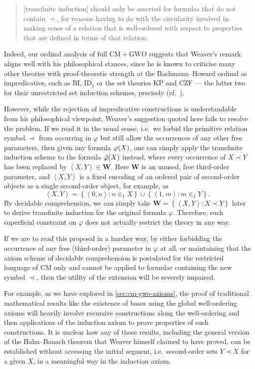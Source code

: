 \documentclass[12pt,openany]{book}
\theoremstyle{plain}
\theoremstyle{definition}
\newcommand\tuple[1]{\left\langle #1 \right\rangle}
\newcommand\BI{\mathrm{BI}}
\newcommand\ID{\mathrm{ID}}
\newcommand\KP{\mathrm{KP}}
\newcommand\CZF{\mathrm{CZF}}
\newcommand\CM{\mathrm{CM}}
\newcommand\GWO{\mathrm{GWO}}
\begin{document}
\begin{quote}
  [transfinite induction] should only be asserted for formulas that do not contain $\prec$, for reasons having to do with the circularity involved in making sense of a relation that is well-ordered with respect to properties that are defined in terms of that relation.
\end{quote}

Indeed, our ordinal analysis of full $\CM + \GWO$ suggests that Weaver's remark aligns well with his philosophical stances, since he is known to criticise many other theories with proof-theoretic strength at the Bachmann--Howard ordinal as impredicative, such as $\BI$, $\ID_1$ or the set theories $\KP$ and $\CZF$ --- the latter two for their unrestricted set induction schemes, precisely (cf.\ \cite{weaver18-predicative-well-ordering}).

However, while the rejection of impredicative constructions is understandable from his philosophical viewpoint, Weaver's suggestion quoted here fails to resolve the problem. If we read it in the usual sense, i.e.\ we forbid the primitive relation symbol $\prec$ from occurring in $\varphi$ but still allow the occurrences of any other free parameters, then given any formula $\varphi\mleft(X\mright)$, one can simply apply the transfinite induction scheme to the formula $\tilde{\varphi}\mleft(X\mright)$ instead, where every occurrence of $X \prec Y$ has been replaced by $\tuple{X, Y} \in \mathbf{W}$. Here $\mathbf{W}$ is an unused, free third-order parameter, and $\tuple{X, Y}$ is a fixed encoding of an ordered pair of second-order objects as a single second-order object, for example, as
\[\tuple{X, Y} = \left\{\tuple{0, n} : n \in_1 X\right\} \cup \left\{\tuple{1, m} : m \in_1 Y\right\}.\]
By decidable comprehension, we can simply take $\mathbf{W} = \left\{\tuple{X, Y} : X \prec Y\right\}$ later to derive transfinite induction for the original formula $\varphi$. Therefore, such superficial constraint on $\varphi$ does not actually restrict the theory in any way.

If we are to read this proposal in a harsher way, by either forbidding the occurrence of any free (third-order) parameter in $\varphi$ at all, or maintaining that the axiom scheme of decidable comprehension is postulated for the restricted language of $\mathrm{CM}$ only and cannot be applied to formulae containing the new symbol $\prec$, then the utility of the extension will be severely impaired.

For example, as we have explored in \autoref{sec:cm-gwo-axioms}, the proof of traditional mathematical results like the existence of bases using the global well-ordering axioms will heavily involve recursive constructions along the well-ordering and then applications of the induction axiom to prove properties of such constructions. It is unclear how any of those results, including the general version of the Hahn--Banach theorem that Weaver himself claimed to have proved, can be established without accessing the initial segment, i.e.\ second-order sets $Y \prec X$ for a given $X$, in a meaningful way in the induction axiom.
\end{document}
